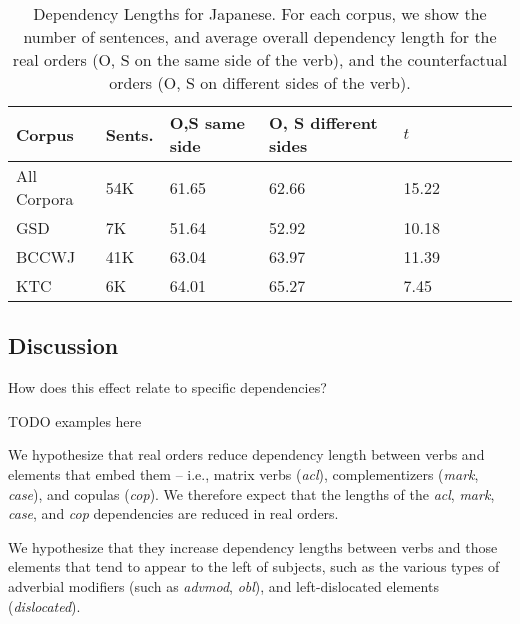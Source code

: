 \documentclass[11pt,a4paper]{article}
\begin{document}
\begin{table}
\begin{center}
\begin{tabular}{l|l|lllllll}
 Corpus                   &   Sents.                     & O,S same side   & O, S different sides  & $t$   \\ \hline\hline
All Corpora     &  54K     & 61.65 & 62.66 &   15.22   \\ \hline
GSD             &   7K       & 51.64 &  52.92  &  10.18  \\
BCCWJ           &   41K       &    63.04   & 63.97 &  11.39  \\
KTC             &   6K   &  64.01 & 65.27 &  7.45\\ \hline
\end{tabular}
\end{center}
\caption{Dependency Lengths for Japanese. For each corpus, we show the number of sentences, and average overall dependency length for the real orders (O, S on the same side of the verb), and the counterfactual orders (O, S on different sides of the verb).}\label{tab:depl-resu}
\end{table}







\subsection{Discussion}
How does this effect relate to specific dependencies?

TODO examples here

We hypothesize that real orders reduce dependency length between verbs and elements that embed them -- i.e., matrix verbs (\emph{acl}), complementizers (\emph{mark}, \emph{case}), and copulas (\emph{cop}).
We therefore expect that the lengths of the \emph{acl}, \emph{mark}, \emph{case}, and \emph{cop} dependencies are reduced in real orders.

We hypothesize that they increase dependency lengths between verbs and those elements that tend to appear to the left of subjects, such as the various types of adverbial modifiers (such as \textit{advmod}, \textit{obl}), and left-dislocated elements (\textit{dislocated}).
\end{document}
